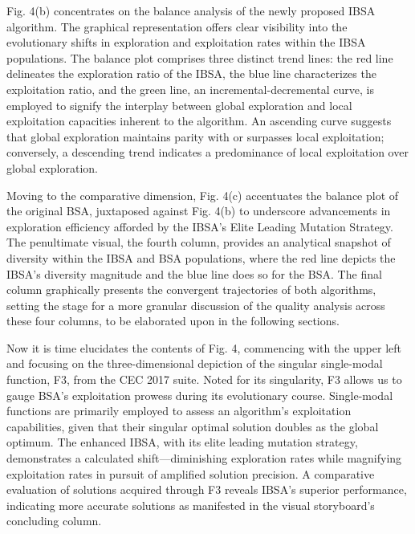 \documentclass{article} %
\begin{document}
Fig. 4(b) concentrates on the balance analysis of the newly proposed IBSA algorithm. The graphical representation offers clear visibility into the evolutionary shifts in exploration and exploitation rates within the IBSA populations. The balance plot comprises three distinct trend lines: the red line delineates the exploration ratio of the IBSA, the blue line characterizes the exploitation ratio, and the green line, an incremental-decremental curve, is employed to signify the interplay between global exploration and local exploitation capacities inherent to the algorithm. An ascending curve suggests that global exploration maintains parity with or surpasses local exploitation; conversely, a descending trend indicates a predominance of local exploitation over global exploration.

Moving to the comparative dimension, Fig. 4(c) accentuates the balance plot of the original BSA, juxtaposed against Fig. 4(b) to underscore advancements in exploration efficiency afforded by the IBSA's Elite Leading Mutation Strategy. The penultimate visual, the fourth column, provides an analytical snapshot of diversity within the IBSA and BSA populations, where the red line depicts the IBSA's diversity magnitude and the blue line does so for the BSA. The final column graphically presents the convergent trajectories of both algorithms, setting the stage for a more granular discussion of the quality analysis across these four columns, to be elaborated upon in the following sections.

Now it is time elucidates the contents of Fig. 4, commencing with the upper left and focusing on the three-dimensional depiction of the singular single-modal function, F3, from the CEC 2017 suite. Noted for its singularity, F3 allows us to gauge BSA's exploitation prowess during its evolutionary course. Single-modal functions are primarily employed to assess an algorithm's exploitation capabilities, given that their singular optimal solution doubles as the global optimum. The enhanced IBSA, with its elite leading mutation strategy, demonstrates a calculated shift---diminishing exploration rates while magnifying exploitation rates in pursuit of amplified solution precision. A comparative evaluation of solutions acquired through F3 reveals IBSA's superior performance, indicating more accurate solutions as manifested in the visual storyboard's concluding column.
\end{document}
